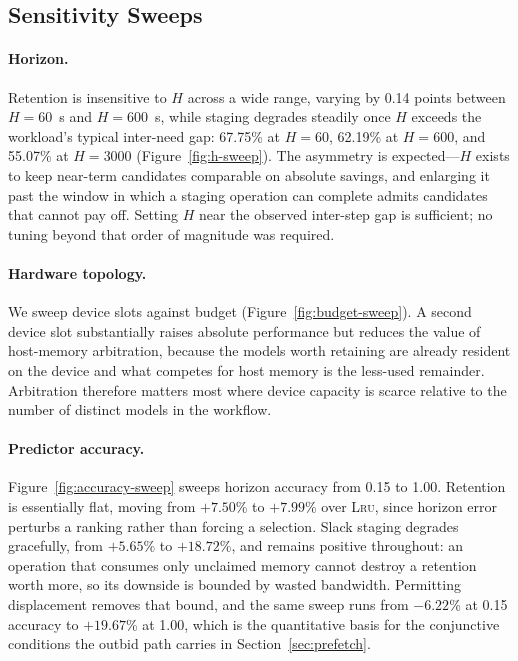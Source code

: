 \subsection{Sensitivity Sweeps}

\paragraph{Horizon.}
Retention is insensitive to $H$ across a wide range, varying by 0.14 points
between $H=60$~s and $H=600$~s, while staging degrades steadily once $H$
exceeds the workload's typical inter-need gap: 67.75\% at $H=60$, 62.19\% at
$H=600$, and 55.07\% at $H=3000$ (Figure~\ref{fig:h-sweep}). The asymmetry is
expected---$H$ exists to keep near-term candidates comparable on absolute
savings, and enlarging it past the window in which a staging operation can
complete admits candidates that cannot pay off. Setting $H$ near the observed
inter-step gap is sufficient; no tuning beyond that order of magnitude was
required.

\paragraph{Hardware topology.}
We sweep device slots against budget (Figure~\ref{fig:budget-sweep}). A second
device slot substantially raises absolute performance but reduces the value of
host-memory arbitration, because the models worth retaining are already
resident on the device and what competes for host memory is the less-used
remainder. Arbitration therefore matters most where device capacity is scarce
relative to the number of distinct models in the workflow.

\paragraph{Predictor accuracy.}
Figure~\ref{fig:accuracy-sweep} sweeps horizon accuracy from 0.15 to 1.00.
Retention is essentially flat, moving from $+7.50$\% to $+7.99$\% over
\textsc{Lru}, since horizon error perturbs a ranking rather than forcing a
selection. Slack staging degrades gracefully, from $+5.65$\% to $+18.72$\%,
and remains positive throughout: an operation that consumes only unclaimed
memory cannot destroy a retention worth more, so its downside is bounded by
wasted bandwidth. Permitting displacement removes that bound, and the same
sweep runs from $-6.22$\% at 0.15 accuracy to $+19.67$\% at 1.00, which is the
quantitative basis for the conjunctive conditions the outbid path carries in
Section~\ref{sec:prefetch}.

